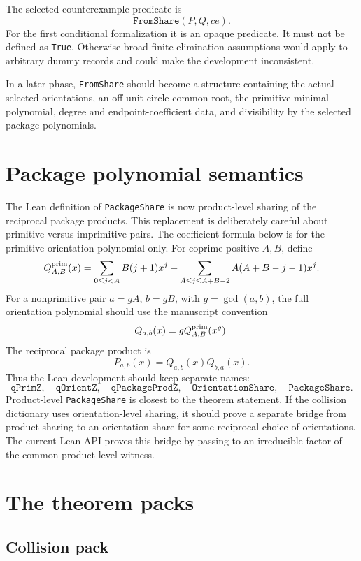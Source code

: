 \documentclass[11pt]{article}
\begin{document}
The selected counterexample predicate is
\[
\texttt{FromShare}(P,Q,ce).
\]
For the first conditional formalization it is an opaque predicate.  It must not
be defined as \verb|True|.  Otherwise broad finite-elimination assumptions would
apply to arbitrary dummy records and could make the development inconsistent.

In a later phase, \verb|FromShare| should become a structure containing the
actual selected orientations, an off-unit-circle common root, the primitive
minimal polynomial, degree and endpoint-coefficient data, and divisibility by
the selected package polynomials.

\section{Package polynomial semantics}

The Lean definition of \verb|PackageShare| is now product-level sharing of the
reciprocal package products.  This replacement is deliberately careful about
primitive versus imprimitive pairs.  The coefficient formula below is for the
primitive orientation polynomial only.  For coprime positive $A,B$, define
\[
Q^{\rm prim}_{A,B}(x)=
\sum_{0\leq j<A} B(j+1)x^j+
\sum_{A\leq j\leq A+B-2} A(A+B-j-1)x^j.
\]
For a nonprimitive pair $a=gA$, $b=gB$, with $g=\gcd(a,b)$, the full orientation
polynomial should use the manuscript convention
\[
Q_{a,b}(x)=g Q^{\rm prim}_{A,B}(x^g).
\]
The reciprocal package product is
\[
P_{a,b}(x)=Q_{a,b}(x)Q_{b,a}(x).
\]
Thus the Lean development should keep separate names:
\[
\texttt{qPrimZ},\quad
\texttt{qOrientZ},\quad
\texttt{qPackageProdZ},\quad
\texttt{OrientationShare},\quad
\texttt{PackageShare}.
\]
Product-level \verb|PackageShare| is closest to the theorem statement.  If the
collision dictionary uses orientation-level sharing, it should prove a separate
bridge from product sharing to an orientation share for some reciprocal-choice
of orientations.  The current Lean API proves this bridge by passing to an
irreducible factor of the common product-level witness.

\section{The theorem packs}

\subsection{Collision pack}
\end{document}
